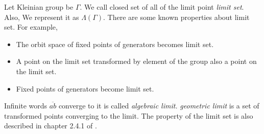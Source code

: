 Let Kleinian group be $\Gamma$.
We call closed set of all of the limit point \textit{limit set}.
Also, We represent it as $\Lambda(\Gamma)$.
There are some known properties about limit set.
For example,
\begin{itemize}
 \item The orbit space of fixed points of generators becomes limit set.
 \item A point on the limit set transformed by element of the group 
       also a point on the limit set.
 \item Fixed points of generators become limit set.
\end{itemize}

Infinite words $\overline{ab}$ converge to it is called \textit{algebraic limit.}
\textit{geometric limit} is a set of transformed points converging to
the limit.
The property of the limit set is also described in chapter 2.4.1 of
\cite{marden_2016}.

